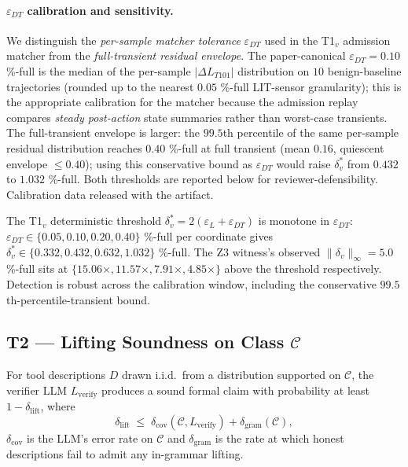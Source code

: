 \paragraph{$\varepsilon_{DT}$ calibration and sensitivity.}
\label{sec:dt-calibration}
We distinguish the \emph{per-sample matcher tolerance}
$\varepsilon_{DT}$ used in the T1${}_v$ admission matcher from the
\emph{full-transient residual envelope}. The paper-canonical
$\varepsilon_{DT} = 0.10$ \%-full is the median of the per-sample
$|\Delta L_{T101}|$ distribution on $10$ benign-baseline trajectories
(rounded up to the nearest $0.05$ \%-full LIT-sensor granularity);
this is the appropriate calibration for the matcher because the
admission replay compares \emph{steady post-action} state summaries
rather than worst-case transients. The full-transient envelope is
larger: the $99.5$th percentile of the same per-sample residual
distribution reaches $0.40$ \%-full at full transient (mean $0.16$,
quiescent envelope $\leq 0.40$); using this conservative bound as
$\varepsilon_{DT}$ would raise $\delta^{*}_v$ from $0.432$ to
$1.032$ \%-full. Both thresholds are reported below for
reviewer-defensibility. Calibration data released with the artifact.

The T1${}_v$ deterministic threshold $\delta^{*}_v = 2(\varepsilon_L
+ \varepsilon_{DT})$ is monotone in $\varepsilon_{DT}$:
$\varepsilon_{DT} \in \{0.05, 0.10, 0.20, 0.40\}$ \%-full per
coordinate gives $\delta^{*}_v \in \{0.332, 0.432, 0.632, 1.032\}$
\%-full. The Z3 witness's observed $\|\delta_v\|_\infty = 5.0$
\%-full sits at $\{15.06\times, 11.57\times, 7.91\times, 4.85\times\}$
above the threshold respectively. Detection is robust across the
calibration window, including the conservative
$99.5$th-percentile-transient bound.

\subsection{T2 --- Lifting Soundness on Class $\mathcal{C}$}

\begin{theorem}
\label{thm:t2}
For tool descriptions $D$ drawn i.i.d.\ from a distribution supported on
$\mathcal{C}$, the verifier LLM $L_{\text{verify}}$ produces a sound
formal claim with probability at least $1 - \delta_{\text{lift}}$, where
\[
\delta_{\text{lift}}
\;\leq\;
\delta_{\text{cov}}(\mathcal{C}, L_{\text{verify}})
+ \delta_{\text{gram}}(\mathcal{C}),
\]
$\delta_{\text{cov}}$ is the LLM's error rate on $\mathcal{C}$ and
$\delta_{\text{gram}}$ is the rate at which honest descriptions fail to
admit any in-grammar lifting.
\end{theorem}

